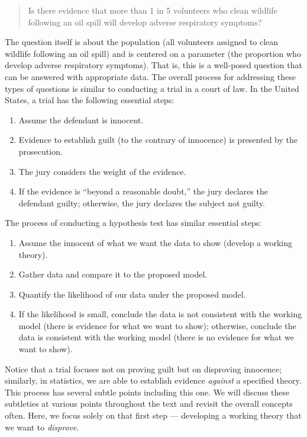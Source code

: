\documentclass[]{book}
\providecommand{\tightlist}{%
  \setlength{\itemsep}{0pt}\setlength{\parskip}{0pt}}
\theoremstyle{definition}
\theoremstyle{definition}
\theoremstyle{remark}
\begin{document}
\begin{quote}
Is there evidence that more than 1 in 5 volunteers who clean wildlife
following an oil spill will develop adverse respiratory symptoms?
\end{quote}

The question itself is about the population (all volunteers assigned to
clean wildlife following an oil spill) and is centered on a parameter
(the proportion who develop adverse respiratory symptoms). That is, this
is a well-posed question that can be answered with appropriate data. The
overall process for addressing these types of questions is similar to
conducting a trial in a court of law. In the United States, a trial has
the following essential steps:

\begin{enumerate}
\def\labelenumi{\arabic{enumi}.}
\tightlist
\item
  Assume the defendant is innocent.
\item
  Evidence to establish guilt (to the contrary of innocence) is
  presented by the prosecution.
\item
  The jury considers the weight of the evidence.
\item
  If the evidence is ``beyond a reasonable doubt,'' the jury declares
  the defendant guilty; otherwise, the jury declares the subject not
  guilty.
\end{enumerate}

The process of conducting a hypothesis test has similar essential steps:

\begin{enumerate}
\def\labelenumi{\arabic{enumi}.}
\tightlist
\item
  Assume the innocent of what we want the data to show (develop a
  working theory).
\item
  Gather data and compare it to the proposed model.
\item
  Quantify the likelihood of our data under the proposed model.
\item
  If the likelihood is small, conclude the data is not consistent with
  the working model (there is evidence for what we want to show);
  otherwise, conclude the data is consistent with the working model
  (there is no evidence for what we want to show).
\end{enumerate}

Notice that a trial focuses not on proving guilt but on disproving
innocence; similarly, in statistics, we are able to establish evidence
\emph{against} a specified theory. This process has several subtle
points including this one. We will discuss these subtleties at various
points throughout the text and revisit the overall concepts often. Here,
we focus solely on that first step --- developing a working theory that
we want to \emph{disprove}.
\end{document}
